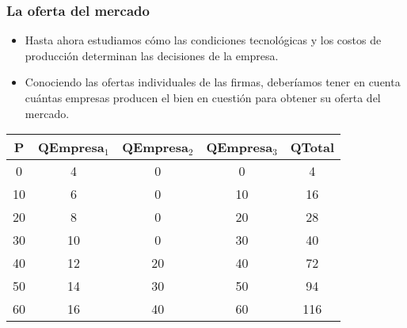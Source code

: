 \documentclass{beamer}
\begin{document}
\begin{frame}
    \frametitle{La oferta del mercado}
    \begin{itemize}
        \item  Hasta ahora estudiamos cómo las condiciones tecnológicas y los costos de producción determinan las decisiones de la empresa. 
        \item Conociendo las ofertas individuales de las firmas, deberíamos tener en cuenta cuántas empresas producen el bien en cuestión para obtener su oferta del mercado. 
    \end{itemize}
    
\renewcommand{\arraystretch}{1.2} %
\begin{table}[h]
    \centering
    \setlength{\arrayrulewidth}{1pt} %
    \begin{tabular}{|c|c|c|c|c|}
        \hline
        \rowcolor{blue!20} %
        \textbf{P} & \textbf{QEmpresa$_1$} & \textbf{QEmpresa$_2$} & \textbf{QEmpresa$_3$} & \textbf{QTotal} \\
        \hline
        0  & 4  & 0  & 0  & 4  \\
        10 & 6  & 0  & 10 & 16 \\
        20 & 8  & 0  & 20 & 28 \\
        30 & 10 & 0  & 30 & 40 \\
        40 & 12 & 20 & 40 & 72 \\
        50 & 14 & 30 & 50 & 94 \\
        60 & 16 & 40 & 60 & 116 \\
        \hline
    \end{tabular}
\end{table}
\end{frame}
\end{document}
